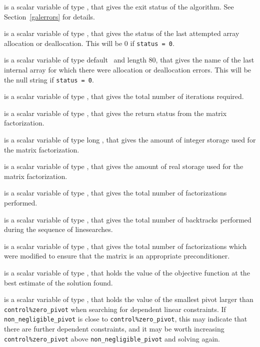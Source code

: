 \begin{description}

 is a scalar variable of type \integer, that gives the
exit status of the algorithm. 
See Section~\ref{galerrors} 
for details.

 is a scalar variable of type \integer, that gives
the status of the last attempted array allocation or deallocation.
This will be 0 if {\tt status = 0}.

 is a scalar variable of type default \character\
and length 80, that  gives the name of the last internal array 
for which there were allocation or deallocation errors.
This will be the null string if {\tt status = 0}. 

 is a scalar variable of type \integer, that gives the
total number of iterations required.

 is a scalar variable of type \integer, that 
gives the return status from the matrix factorization.

 is a scalar variable of type long
\integer, that gives the amount of integer storage used for the matrix 
factorization.

 is a scalar variable of type \longinteger, 
that gives the amount of real storage used for the matrix factorization.

 is a scalar variable of type \integer, that gives the
total number of factorizations performed.

 is a scalar variable of type \integer, that gives the
total number of backtracks performed during the sequence of linesearches.

 is a scalar variable of type \integer, that gives the
total number of factorizations which were modified to 
ensure that the matrix is an appropriate preconditioner. 

 is a scalar variable of type \realdp, that holds the
value of the objective function at the best estimate of the solution found.

 is a scalar variable of type \realdp, 
that holds the value of the smallest pivot larger than {\tt control\%zero\_pivot}
when searching for dependent linear constraints. If 
{\tt non\_negligible\_pivot} is close to  {\tt control\%zero\_pivot},
this may indicate that there are further dependent constraints, and
it may be worth increasing {\tt control\%zero\_pivot} above 
{\tt non\_negligible\_pivot} and solving again.


\end{description}
